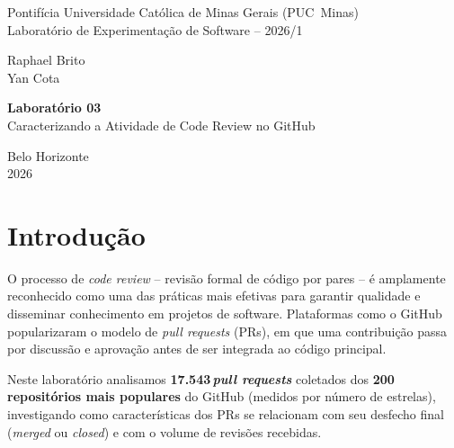 \documentclass[10pt,a4paper,twocolumn]{article}
\begin{document}
\onecolumn

\begin{titlepage}
  \centering
  \vspace*{2.0cm}

  {\normalsize
    Pontifícia Universidade Católica de Minas Gerais (PUC~Minas)\\
    Laboratório de Experimentação de Software -- 2026/1
  }

  \vspace*{2.8cm}

  {\large
    Raphael Brito\\[0.3em]
    Yan Cota
  }

  \vspace*{4.2cm}

  {\LARGE \textbf{Laboratório 03}\\[0.5em]
  \Large Caracterizando a Atividade de Code Review no GitHub}

  \vfill

  {\normalsize Belo Horizonte\\ 2026}
\end{titlepage}

\tableofcontents
\newpage
{}
\setcounter{page}{1}
\twocolumn

\section{Introdução}

O processo de \textit{code review} -- revisão formal de código por pares -- é
amplamente reconhecido como uma das práticas mais efetivas para garantir
qualidade e disseminar conhecimento em projetos de software.
Plataformas como o GitHub popularizaram o modelo de \textit{pull requests}
(PRs), em que uma contribuição passa por discussão e aprovação antes de ser
integrada ao código principal.

Neste laboratório analisamos \textbf{17.543\,\textit{pull requests}}
coletados dos \textbf{200 repositórios mais populares} do GitHub (medidos
por número de estrelas), investigando como características dos PRs se
relacionam com seu desfecho final (\textit{merged} ou \textit{closed}) e com
o volume de revisões recebidas.
\end{document}
